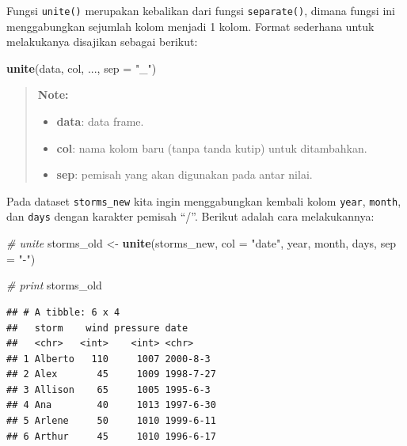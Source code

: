\documentclass[]{book}
\newenvironment{Shaded}{\begin{snugshade}}{\end{snugshade}}
\newcommand{\KeywordTok}[1]{\textcolor[rgb]{0.13,0.29,0.53}{\textbf{#1}}}
\newcommand{\DataTypeTok}[1]{\textcolor[rgb]{0.13,0.29,0.53}{#1}}
\newcommand{\StringTok}[1]{\textcolor[rgb]{0.31,0.60,0.02}{#1}}
\newcommand{\CommentTok}[1]{\textcolor[rgb]{0.56,0.35,0.01}{\textit{#1}}}
\newcommand{\OperatorTok}[1]{\textcolor[rgb]{0.81,0.36,0.00}{\textbf{#1}}}
\newcommand{\NormalTok}[1]{#1}
\providecommand{\tightlist}{%
  \setlength{\itemsep}{0pt}\setlength{\parskip}{0pt}}
\begin{document}
Fungsi \texttt{unite()} merupakan kebalikan dari fungsi
\texttt{separate()}, dimana fungsi ini menggabungkan sejumlah kolom
menjadi 1 kolom. Format sederhana untuk melakukanya disajikan sebagai
berikut:

\begin{Shaded}
\begin{Highlighting}[]
\KeywordTok{unite}\NormalTok{(data, col, ..., }\DataTypeTok{sep =} \StringTok{"_"}\NormalTok{)}
\end{Highlighting}
\end{Shaded}

\begin{quote}
\textbf{Note: }

\begin{itemize}
\tightlist
\item
  \textbf{data}: data frame.
\item
  \textbf{col}: nama kolom baru (tanpa tanda kutip) untuk ditambahkan.
\item
  \textbf{sep}: pemisah yang akan digunakan pada antar nilai.
\end{itemize}
\end{quote}

Pada dataset \texttt{storms\_new} kita ingin menggabungkan kembali kolom
\texttt{year}, \texttt{month}, dan \texttt{days} dengan karakter pemisah
``/''. Berikut adalah cara melakukannya:

\begin{Shaded}
\begin{Highlighting}[]
\CommentTok{# unite}
\NormalTok{storms_old <-}\StringTok{ }\KeywordTok{unite}\NormalTok{(storms_new,}
                   \DataTypeTok{col =} \StringTok{"date"}\NormalTok{,}
\NormalTok{                   year, month, days,}
                   \DataTypeTok{sep =} \StringTok{"-"}\NormalTok{)}

\CommentTok{# print}
\NormalTok{storms_old}
\end{Highlighting}
\end{Shaded}

\begin{verbatim}
## # A tibble: 6 x 4
##   storm    wind pressure date     
##   <chr>   <int>    <int> <chr>    
## 1 Alberto   110     1007 2000-8-3 
## 2 Alex       45     1009 1998-7-27
## 3 Allison    65     1005 1995-6-3 
## 4 Ana        40     1013 1997-6-30
## 5 Arlene     50     1010 1999-6-11
## 6 Arthur     45     1010 1996-6-17
\end{verbatim}

\begin{Shaded}
\end{Shaded}
\end{document}
